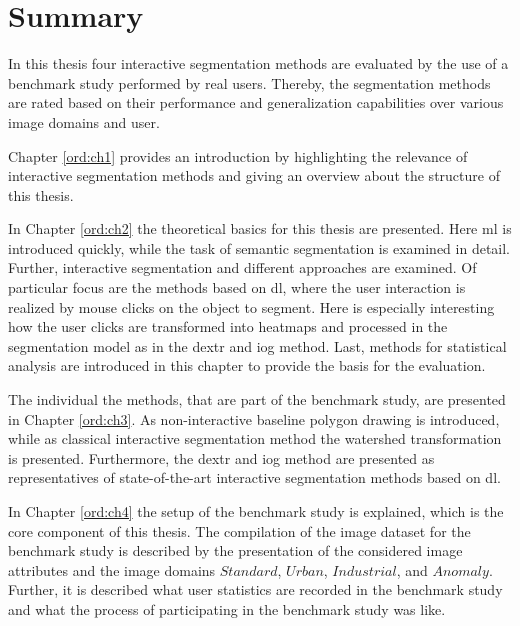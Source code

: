 
\section{Summary}

In this thesis four interactive segmentation methods are evaluated by the use of a benchmark study performed by real users.
Thereby, the segmentation methods are rated based on their performance and generalization capabilities over various image domains and user.


Chapter \ref{ord:ch1} provides an introduction by highlighting the relevance of interactive segmentation methods and giving an overview about the structure of this thesis.

In Chapter \ref{ord:ch2} the theoretical basics for this thesis are presented.
Here \gls{ml} is introduced quickly, while the task of semantic segmentation is examined in detail.
Further, interactive segmentation and different approaches are examined.
Of particular focus are the methods based on \gls{dl}, where the user interaction is realized by mouse clicks on the object to segment.
Here is especially interesting how the user clicks are transformed into heatmaps and processed in the segmentation model as in the \gls{dextr} and \gls{iog} method.
Last, methods for statistical analysis are introduced in this chapter to provide the basis for the evaluation.

The individual the methods, that are part of the benchmark study, are presented in Chapter \ref{ord:ch3}.
As non-interactive baseline polygon drawing is introduced, while as classical interactive segmentation method the watershed transformation is presented.
Furthermore, the \gls{dextr} \cite{Man18-DEXTR} and \gls{iog} \cite{Zha20-IOG} method are presented as representatives of state-of-the-art interactive segmentation methods based on \gls{dl}.

In Chapter \ref{ord:ch4} the setup of the benchmark study is explained, which is the core component of this thesis.
The compilation of the image dataset for the benchmark study is described by the presentation of the considered image attributes and the image domains $ Standard $, $ Urban $, $ Industrial $, and $ Anomaly $.
Further, it is described what user statistics are recorded in the benchmark study and what the process of participating in the benchmark study was like.

